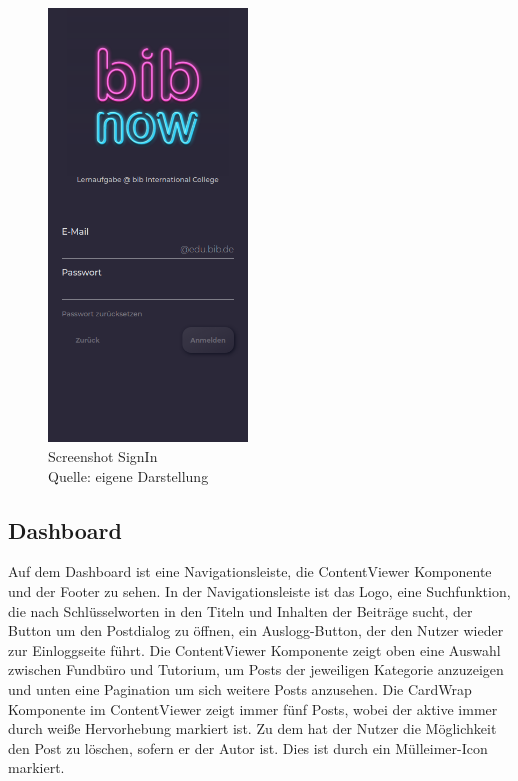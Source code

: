 \documentclass[12pt,titlepage]{article}
\begin{document}
\begin{figure}[hbt!]
\centering
\includegraphics[width=150pt]{screenshots/Screenshot_Mobil3.png}
\caption[Srenshot Sign In]{Screenshot SignIn \\Quelle: eigene Darstellung}
\end{figure}

\FloatBarrier

\subsection{Dashboard}

Auf dem Dashboard ist eine Navigationsleiste, die ContentViewer Komponente und der Footer zu sehen. In der Navigationsleiste ist das Logo, eine Suchfunktion, die nach Schlüsselworten in den Titeln und Inhalten der Beiträge sucht, der Button um den Postdialog zu öffnen, ein Auslogg-Button, der den Nutzer wieder zur Einloggseite führt. Die ContentViewer Komponente zeigt oben eine Auswahl zwischen Fundbüro und Tutorium, um Posts der jeweiligen Kategorie anzuzeigen und unten eine Pagination um sich weitere Posts anzusehen. Die CardWrap Komponente im ContentViewer zeigt immer fünf Posts, wobei der aktive immer durch weiße Hervorhebung markiert ist. Zu dem hat der Nutzer die Möglichkeit den Post zu löschen, sofern er der Autor ist. Dies ist durch ein Mülleimer-Icon markiert.
\end{document}
